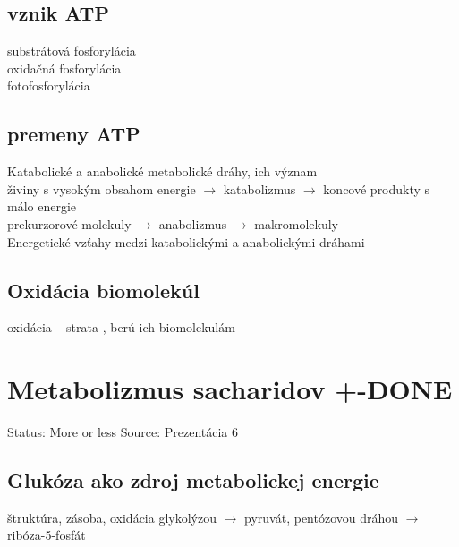 \subsection*{vznik ATP}
substrátová fosforylácia\\
oxidačná fosforylácia\\
fotofosforylácia\\
\subsection*{premeny ATP}
Katabolické a anabolické metabolické dráhy, ich význam\\
\tab živiny s vysokým obsahom energie $\rightarrow$ katabolizmus $\rightarrow$ koncové produkty s málo energie\\
\tab prekurzorové molekuly $\rightarrow$ anabolizmus $\rightarrow$ makromolekuly\\
Energetické vzťahy medzi katabolickými a anabolickými dráhami\\

\subsection*{Oxidácia biomolekúl}
oxidácia -- strata \el, berú ich biomolekulám
\\
\section{Metabolizmus sacharidov +-DONE}

Status: More or less
Source: Prezentácia 6

\subsection*{Glukóza ako zdroj metabolickej energie}
štruktúra, zásoba, oxidácia glykolýzou $\rightarrow$ pyruvát, pentózovou dráhou $\rightarrow$ ribóza-5-fosfát\\
